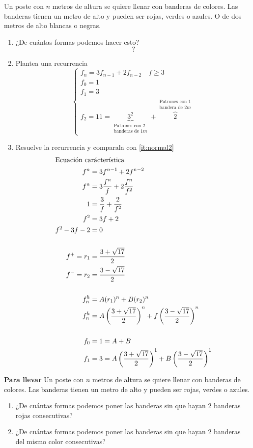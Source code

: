 \documentclass[../main.tex]{subfiles}
\begin{document}
Un poste con $n$ metros de altura se quiere llenar con banderas de colores.
Las banderas tienen un metro de alto y pueden ser rojas, verdes o azules.
O de dos metros de alto blancas o negras.
\begin{enumerate}
	\item\label{it:normal2} ¿De cuántas formas podemos hacer esto?
		\[
			?
		\]
	\item Plantea una recurrencia
		\[
			\begin{cases}
				f_n = 3f_{n-1}+ 2f_{n-2} \quad f \geq 3\\
				f_0 = 1\\
				f_1 = 3\\
				f_2 = 11 =
				\underbrace
				{
					3^2
				}_
				{
					\substack
					{
						\text{Patrones con $2$}\\
						\text{banderas de $1m$}
					}
				}
				+
				\overbrace
				{
					2
				}^
				{
					\substack
					{
						\text{Patrones con $1$}\\
						\text{bandera de $2m$}
					}
				}
			\end{cases}
		\]
	\item Resuelve la recurrencia y comparala con \ref{it:normal2}
		\begin{align*}
			\intertext{Ecuación carácterística}
			f^n &= 3f^{n-1}+2f^{n-2}\\
			f^n &= 3 \frac{f^n}{f} +2 \frac{f^n}{f^2}\\
			1 &= \frac{3}{f} + \frac{2}{f^2}\\
			f^2 &= 3f + 2\\
			f^2 - 3f - 2 &= 0\\
			\\
			f^+ = r_1 &= \frac{3+\sqrt{17}}{2} \\
			f^- = r_2 &= \frac{3-\sqrt{17}}{2}\\
			\\
			f_n^h &= A(r_1)^n + B(r_2)^n\\
			f_n^h &=
			A\left(
				\frac{3+\sqrt{17}}{2}
			\right)^n
			+
			f\left(
				\frac{3-\sqrt{17}}{2}
			\right)^n\\
			\\
			f_0 &= 1 = A + B\\
			f_1 &= 3 =
			A
			\left(
			\frac{3+\sqrt{17}}{2}
			\right)^1
			+
			B
			\left(
			\frac{3-\sqrt{17}}{2}
			\right)^1
		\end{align*}
\end{enumerate}
\textbf{Para llevar}
Un poste con $n$ metros de altura se quiere llenar con banderas de colores.
Las banderas tienen un metro de alto y pueden ser rojas, verdes o azules.
\begin{enumerate}
	\item ¿De cuántas formas podemos poner las banderas sin que hayan
		$2$ banderas rojas consecutivas?
	\item ¿De cuántas formas podemos poner las banderas sin que hayan
		$2$ banderas del mismo color consecutivas?
\end{enumerate}
\end{document}
